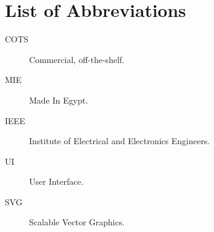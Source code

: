 \chapter*{List of Abbreviations}
\thispagestyle{plain}

\begin{description}
\item [COTS] Commercial, off-the-shelf. \cite{abb_cots}
\item [MIE] Made In Egypt.
\item [IEEE] Institute of Electrical and Electronics Engineers. \cite{abb_ieee}
\item [UI] User Interface.
\item [SVG] Scalable Vector Graphics. \cite{abb_svg}

\end{description}

